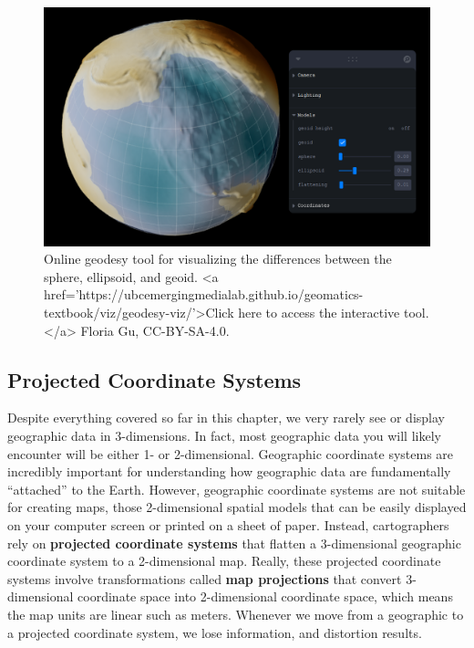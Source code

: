 \documentclass[
]{book}
\begin{document}
\begin{figure}
\includegraphics[width=0.75\linewidth]{images/02-geodesy-visualization-static} \caption{Online geodesy tool for visualizing the differences between the sphere, ellipsoid, and geoid. <a href='https://ubcemergingmedialab.github.io/geomatics-textbook/viz/geodesy-viz/'>Click here to access the interactive tool.</a> Floria Gu, CC-BY-SA-4.0.}\label{fig:2-geodesy-visualization-static}
\end{figure}

\subsection{Projected Coordinate Systems}\label{projected-coordinate-systems}

Despite everything covered so far in this chapter, we very rarely see or display geographic data in 3-dimensions. In fact, most geographic data you will likely encounter will be either 1- or 2-dimensional. Geographic coordinate systems are incredibly important for understanding how geographic data are fundamentally ``attached'' to the Earth. However, geographic coordinate systems are not suitable for creating maps, those 2-dimensional spatial models that can be easily displayed on your computer screen or printed on a sheet of paper. Instead, cartographers rely on \textbf{projected coordinate systems} that flatten a 3-dimensional geographic coordinate system to a 2-dimensional map. Really, these projected coordinate systems involve transformations called \textbf{map projections} that convert 3-dimensional coordinate space into 2-dimensional coordinate space, which means the map units are linear such as meters. Whenever we move from a geographic to a projected coordinate system, we lose information, and distortion results.
\end{document}
